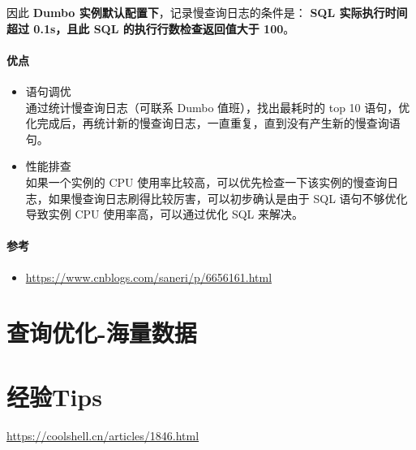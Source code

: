 \documentclass[UTF8,a4paper,12pt]{ctexbook}
\begin{document}
			
			因此 \textbf{Dumbo 实例默认配置下}，记录慢查询日志的条件是：
			\textbf{SQL 实际执行时间超过 0.1s，且此 SQL 的执行行数检查返回值大于 100}。
		\paragraph{优点}
			\begin{itemize}
				\item 语句调优 \\ 通过统计慢查询日志（可联系 Dumbo 值班），找出最耗时的 top 10 语句，优化完成后，再统计新的慢查询日志，一直重复，直到没有产生新的慢查询语句。
				\item 性能排查 \\ 如果一个实例的 CPU 使用率比较高，可以优先检查一下该实例的慢查询日志，如果慢查询日志刷得比较厉害，可以初步确认是由于 SQL 语句不够优化导致实例 CPU 使用率高，可以通过优化 SQL 来解决。
			\end{itemize}
		
		\paragraph{参考}
			\begin{itemize}
				\item \url{https://www.cnblogs.com/saneri/p/6656161.html}
			\end{itemize}
			
	\section{查询优化-海量数据}
	
	\section{经验Tips}
		\url{https://coolshell.cn/articles/1846.html}
		
\end{document}
